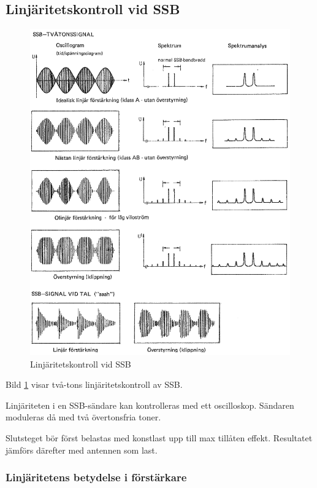 \subsection{Linjäritetskontroll vid SSB}

\begin{figure}
\includegraphics[width=\textwidth]{images/cropped_pdfs/bild_2_3-53.pdf}
\caption{Linjäritetskontroll vid SSB}
\label{fig:BildII3-53}
\end{figure}

Bild \ref{fig:BildII3-53} visar två-tons linjäritetskontroll av SSB.

Linjäriteten i en SSB-sändare kan kontrolleras med ett oscilloskop.
Sändaren moduleras då med två övertonsfria toner.

Slutsteget bör först belastas med konstlast upp till max tillåten effekt.
Resultatet jämförs därefter med antennen som last.

\subsubsection{Linjäritetens betydelse i förstärkare}

